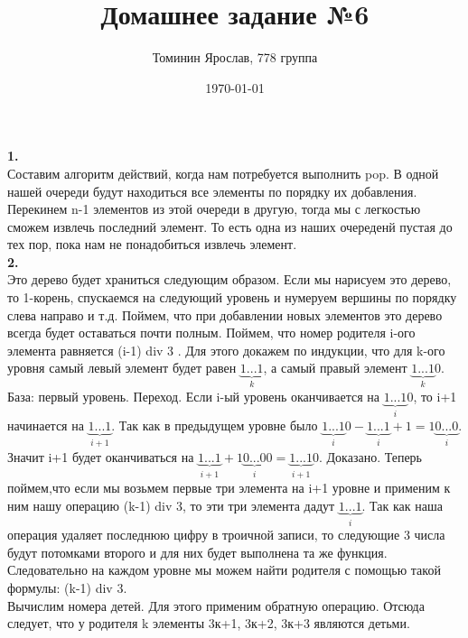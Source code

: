 \documentclass[a4paper,12pt]{article}
\author{Томинин Ярослав, 778 группа}
\title{Домашнее задание №6}
\date{\today}
\begin{document}
 

\maketitle
\newpage
\textbf{1.}\\
Составим алгоритм действий, когда нам потребуется выполнить pop. В одной нашей очереди будут находиться все элементы по порядку их добавления. Перекинем n-1 элементов из этой очереди в другую, тогда мы с легкостью сможем извлечь последний элемент. То есть одна из наших очереденй пустая до тех пор, пока нам не понадобиться извлечь элемент.\\
\textbf{2.}\\
Это дерево будет храниться следующим образом. Если мы нарисуем это дерево, то 1-корень, спускаемся на следующий уровень и нумеруем вершины по порядку слева направо и т.д. Поймем, что при добавлении новых элементов это дерево всегда будет оставаться почти полным. Поймем, что номер родителя i-ого элемента равняется (i-1) div 3 . Для этого докажем по индукции, что для k-ого уровня самый левый элемент будет равен $\underbrace{1...1}_k$, а самый правый элемент $\underbrace{1...1}_k0$. База: первый уровень.
Переход. Если i-ый уровень оканчивается на $\underbrace{1...1}_i0$, то i+1 начинается на $\underbrace{1...1}_{i+1}$. Так как в предыдущем уровне было $\underbrace{1...1}_i0-\underbrace{1...1}_i+1=1\underbrace{0...0}_{i}$. Значит i+1 будет оканчиваться на $\underbrace{1...1}_{i+1}+1\underbrace{0...0}_{i}0=\underbrace{1...1}_{i+1}0$. Доказано. Теперь поймем,что если мы возьмем первые три элемента на i+1 уровне и применим к ним нашу операцию (k-1) div 3, то эти три элемента дадут $\underbrace{1...1}_i$. Так как наша операция удаляет последнюю цифру в троичной записи, то следующие 3 числа будут потомками второго и для них будет выполнена та же функция. Следовательно на каждом уровне мы можем найти родителя с помощью такой формулы: (k-1) div 3.\\
Вычислим номера детей. Для этого применим обратную операцию. Отсюда следует, что у родителя k элементы  3к+1, 3к+2, 3к+3 являются детьми.\\
\end{document}
